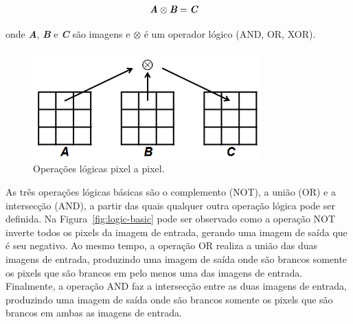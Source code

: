 \begin{align}
 &\textit{\textbf{A}} \otimes \textit{\textbf{B}} = \textit{\textbf{C}}
\end{align}

onde \textit{\textbf{A}}, \textit{\textbf{B}} e \textit{\textbf{C}}
são imagens e $\otimes$ é um operador lógico (AND, OR, XOR).

\begin{figure} [h]
  \begin{center}
    \includegraphics[height=119pt,width=250pt]{images/fig_logic-puntual}
    \caption{Operações lógicas pixel a
      pixel.}\label{fig:logic-puntual}
  \end{center}
\end{figure}

As três operações lógicas básicas são o complemento (NOT), a união
(OR) e a intersecção (AND), a partir das quais qualquer outra operação
lógica pode ser definida. Na Figura~\ref{fig:logic-basic} pode ser
observado como a operação NOT inverte todos os pixels da imagem de
entrada, gerando uma imagem de saída que é seu negativo. Ao mesmo
tempo, a operação OR realiza a união das duas imagens de entrada,
produzindo uma imagem de saída onde são brancos somente os pixels que
são brancos em pelo menos uma das imagens de entrada. Finalmente, a
operação AND faz a intersecção entre as duas imagens de entrada,
produzindo uma imagem de saída onde são brancos somente os pixels que
são brancos em ambas as imagens de entrada.

